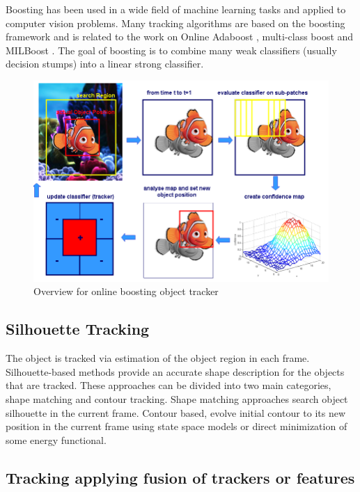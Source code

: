 \begin{itemize}
	Boosting has been used in a wide field of machine learning tasks and applied to computer vision problems. Many tracking algorithms are based on the boosting framework \cite{Freund1997a} and is related to the work on Online Adaboost \cite{Avidan2007,Grabner2008,Oza2000}, multi-class boost \cite{Saffari2010} and MILBoost \cite{Babenko2010}. The goal of boosting is to combine many weak classifiers (usually decision stumps) into a linear strong classifier.

	\begin{figure}[t!]
		\centering
			\includegraphics[width=0.7\linewidth]{Figures/overview_boost.png}
		\caption{Overview for online boosting object tracker}
		\label{fig::overview_boost}
	\end{figure}


\end{itemize}


\subsection{Silhouette Tracking}

The object is tracked via estimation of the object region in each frame. Silhouette-based methods provide an accurate shape description for the objects that are tracked. These approaches can be divided into two main categories, shape matching and contour tracking. Shape matching approaches search object silhouette in the current frame. Contour based, evolve initial contour to its new position in the current frame using state space models or direct minimization of some energy functional.

\subsection{Tracking applying fusion of trackers or features}

